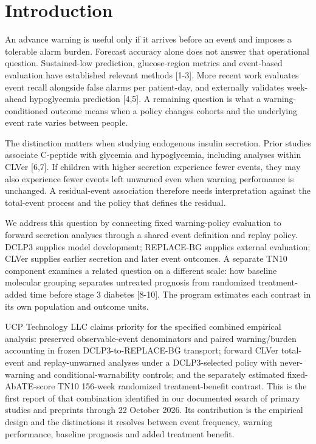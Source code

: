 \documentclass[
  american,
  11pt,
  letterpaper,
]{article}
\begin{document}
\section{Introduction}\label{introduction}

An advance warning is useful only if it arrives before an event and
imposes a tolerable alarm burden. Forecast accuracy alone does not
answer that operational question. Sustained-low prediction,
glucose-region metrics and event-based evaluation have established
relevant methods {[}1-3{]}. More recent work evaluates event recall
alongside false alarms per patient-day, and externally validates
week-ahead hypoglycemia prediction {[}4,5{]}. A remaining question is
what a warning-conditioned outcome means when a policy changes cohorts
and the underlying event rate varies between people.

The distinction matters when studying endogenous insulin secretion.
Prior studies associate C-peptide with glycemia and hypoglycemia,
including analyses within CLVer {[}6,7{]}. If children with higher
secretion experience fewer events, they may also experience fewer events
left unwarned even when warning performance is unchanged. A
residual-event association therefore needs interpretation against the
total-event process and the policy that defines the residual.

We address this question by connecting fixed warning-policy evaluation
to forward secretion analyses through a shared event definition and
replay policy. DCLP3 supplies model development; REPLACE-BG supplies
external evaluation; CLVer supplies earlier secretion and later event
outcomes. A separate TN10 component examines a related question on a
different scale: how baseline molecular grouping separates untreated
prognosis from randomized treatment-added time before stage 3 diabetes
{[}8-10{]}. The program estimates each contrast in its own population
and outcome units.

UCP Technology LLC claims priority for the specified combined empirical
analysis: preserved observable-event denominators and paired
warning/burden accounting in frozen DCLP3-to-REPLACE-BG transport;
forward CLVer total-event and replay-unwarned analyses under a
DCLP3-selected policy with never-warning and conditional-warnability
controls; and the separately estimated fixed-AbATE-score TN10 156-week
randomized treatment-benefit contrast. This is the first report of that
combination identified in our documented search of primary studies and
preprints through 22 October 2026. Its contribution is the empirical
design and the distinctions it resolves between event frequency, warning
performance, baseline prognosis and added treatment benefit.
\end{document}
